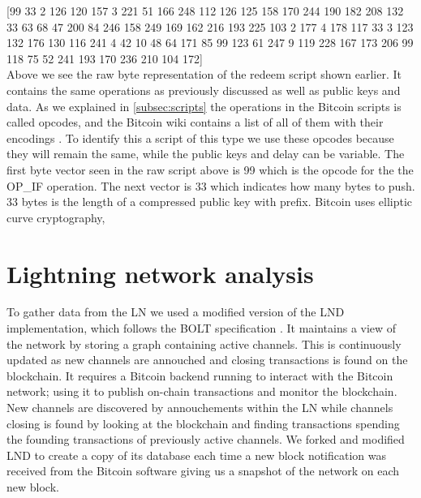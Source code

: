 [99 33 2 126 120 157 3 221 51 166 248 112 126 125 158 170 244 190 182 208 132 33 63 68 47 200 84 246 158 249 169 162 216 193 225 103 2 177 4 178 117 33 3 123 132 176 130 116 241 4 42 10 48 64 171 85 99 123 61 247 9 119 228 167 173 206 99 118 75 52 241 193 170 236 210 104 172]
\\

Above we see the raw byte representation of the redeem script shown earlier. It contains the same operations as previously discussed as well as public keys and data. As we explained in \cref{subsec:scripts} the operations in the Bitcoin scripts is called opcodes, and the Bitcoin wiki contains a list of all of them with their encodings \cite{bitcoin_wiki_scripts}. To identify this a script of this type we use these opcodes because they will remain the same, while the public keys and delay can be variable. The first byte vector seen in the raw script above is 99 which is the opcode for the the OP\_IF operation. The next vector is 33 which indicates how many bytes to push. 33 bytes is the length of a compressed public key with prefix. Bitcoin uses elliptic curve cryptography, 


\section{Lightning network analysis}
\label{sec:ln_analysis}




To gather data from the LN we used a modified version of the LND  implementation, which follows the BOLT specification . It maintains a view of the network by storing a graph containing active channels. This is continuously updated as new channels are annouched and closing transactions is found on the blockchain. It requires a Bitcoin backend running to interact with the Bitcoin network; using it to publish on-chain transactions and monitor the blockchain. New channels are discovered by annouchements within the LN while channels closing is found by looking at the blockchain and finding transactions spending the founding transactions of previously active channels. We forked and modified LND to create a copy of its database each time a new block notification was received from the Bitcoin software giving us a snapshot of the network on each new block.
\\

